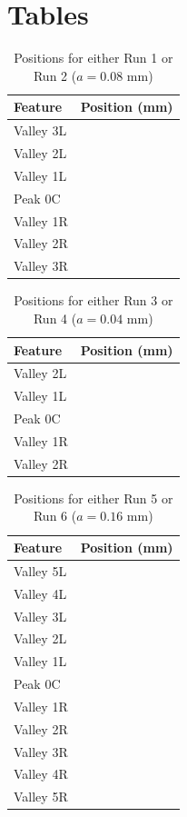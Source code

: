 \section{Tables}
\begin{table}[ht!]
    \centering
    \begin{tabular}{|l|r|}
        \hline
        Feature & Position (mm) \\
        \hline
        Valley 3L & \\
        Valley 2L & \\
        Valley 1L & \\
        \hline
        Peak 0C & \\
        \hline
        Valley 1R & \\
        Valley 2R & \\
        Valley 3R & \\
        \hline
    \end{tabular}
    \caption{Positions for either Run 1 or Run 2 ($a = 0.08$ mm)}
    \label{table.11.pos.12}
\end{table}
\begin{table}[ht!]
    \centering
    \begin{tabular}{|l|r|}
        \hline
        Feature & Position (mm) \\
        \hline
        Valley 2L & \\
        Valley 1L & \\
        \hline
        Peak 0C & \\
        \hline
        Valley 1R & \\
        Valley 2R & \\
        \hline
    \end{tabular}
    \caption{Positions for either Run 3 or Run 4 ($a = 0.04$ mm)}
    \label{table.11.pos.34}
\end{table}
\begin{table}[ht!]
    \centering
    \begin{tabular}{|l|r|}
        \hline
        Feature & Position (mm) \\
        \hline
        Valley 5L & \\
        Valley 4L & \\
        Valley 3L & \\
        Valley 2L & \\
        Valley 1L & \\
        \hline
        Peak 0C & \\
        \hline
        Valley 1R & \\
        Valley 2R & \\
        Valley 3R & \\
        Valley 4R & \\
        Valley 5R & \\
        \hline
    \end{tabular}
    \caption{Positions for either Run 5 or Run 6 ($a = 0.16$ mm)}
    \label{table.11.pos.56}
\end{table}
